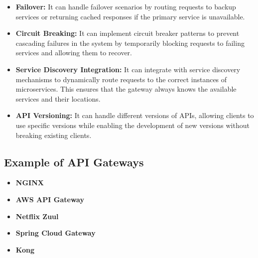 \documentclass[a4paper, 12pt]{article}
\begin{document}
\begin{itemize}
        \item \textbf{Failover: }It can handle failover scenarios by routing requests to backup services or returning cached responses if the primary service is unavailable.
        \item \textbf{Circuit Breaking: }It can implement circuit breaker patterns to prevent cascading failures in the system by temporarily blocking requests to failing services and allowing them to recover.
        \item \textbf{Service Discovery Integration: }It can integrate with service discovery mechanisms to dynamically route requests to the correct instances of microservices. This ensures that the gateway always knows the available services and their locations.
        \item \textbf{API Versioning: }It can handle different versions of APIs, allowing clients to use specific versions while enabling the development of new versions without breaking existing clients.
    \end{itemize}

    \subsection*{Example of API Gateways}
    \begin{itemize}
        \item \textbf{NGINX}
        \item \textbf{AWS API Gateway}
        \item \textbf{Netflix Zuul}
        \item \textbf{Spring Cloud Gateway}
        \item \textbf{Kong}
    \end{itemize}
\end{document}
